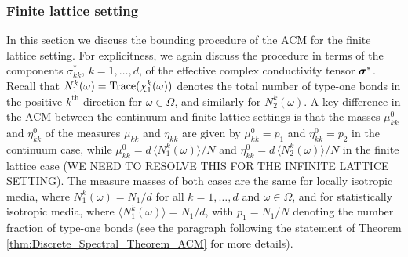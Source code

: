 \documentclass{cmslatex}
\newcommand\bsig{\mbox{\boldmath${\sigma}$}}
\begin{document}
\subsubsection{Finite lattice setting}
\label{sec:Bounds_finite_lattice_setting}
%
In this section we discuss the bounding procedure of the ACM for the
finite lattice setting. For explicitness, we again discuss the
procedure in terms of the components $\sigma^*_{kk}$, $k=1,\ldots,d$, of the
effective complex conductivity tensor $\bsig^*$. Recall that
$N_1^k(\omega)={\rm Trace}(\chi_1^k(\omega))$ denotes the total number of type-one
bonds in the positive $k^{\text{th}}$ direction for $\omega\in\Omega$, and
similarly for $N_2^k(\omega)$. A key difference in the ACM between the
continuum and finite lattice settings is that the masses $\mu_{kk}^0$
and $\eta_{kk}^0$ of the measures $\mu_{kk}$ and $\eta_{kk}$ are given by
$\mu_{kk}^0=p_1$ and $\eta_{kk}^0=p_2$ in the continuum case, while
$\mu_{kk}^0=d\,\langle N_1^k(\omega)\rangle/N$ and $\eta_{kk}^0=d\,\langle N_2^k(\omega)\rangle/N$ in the
finite lattice case (WE NEED TO RESOLVE THIS FOR THE INFINITE LATTICE
SETTING). The measure masses of both cases are the same for locally
isotropic media, where $N_1^k(\omega)=N_1/d$ for all $k=1,\ldots,d$ and $\omega\in\Omega$,
and for statistically isotropic media, where $\langle N_1^k(\omega)\rangle=N_1/d$, with
$p_1=N_1/N$ denoting the number fraction of type-one bonds (see the 
paragraph following the statement of Theorem
\ref{thm:Discrete_Spectral_Theorem_ACM} for more details). 
\end{document}
